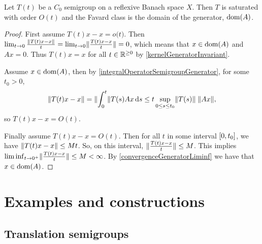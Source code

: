 \begin{proposition}
Let $T(t)$ be a $C_0$ semigroup on a reflexive Banach space $X$. Then $T$ is saturated with order $O(t)$ and the Favard class is the domain of the generator, $\operatorname{dom}(A)$.
\end{proposition}
\begin{proof}
First assume $T(t)x - x = o\big(t\big)$. Then $\lim_{t\to 0} \frac{\lVert T(t)x - x\rVert}{t} = \lim_{t\to 0}\lVert\frac{T(t)x-x}{t}\rVert = 0$, which means that $x\in \operatorname{dom}(A)$ and $Ax = 0$. Thus $T(t)x = x$ for all $t\in\mathbb{R}^{\geq 0}$ by \ref{kernelGeneratorInvariant}.

Assume $x\in\operatorname{dom}(A)$, then by \ref{integralOperatorSemigroupGenerator}, for some $t_0 > 0$,
\[ \lVert T(t)x-x\rVert = \lVert\int_0^t\rVert T(s)Ax\operatorname{d \!}{s}\leq t\sup_{0\leq s \leq t_0}\lVert T(s)\rVert\;\lVert Ax\rVert, \]
so $T(t)x-x = O(t)$.

Finally assume $T(t)x-x = O(t)$. Then for all $t$ in some interval $\interval{0,t_0}$, we have $\lVert T(t)x-x\rVert \leq Mt$. So, on this interval, $\lVert\frac{T(t)x-x}{t}\rVert \leq M$. This implies $\liminf_{t\to 0^+}\lVert\frac{T(t)x-x}{t}\rVert \leq M < \infty$. By \ref{convergenceGeneratorLiminf} we have that $x\in\operatorname{dom}(A)$.
\end{proof}


\section{Examples and constructions}
\subsection{Translation semigroups}

